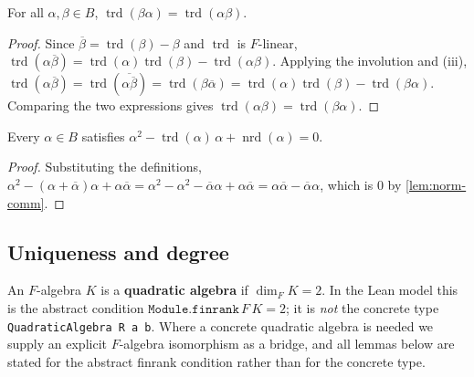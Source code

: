 \begin{lemma}
    \label{lem:trace-comm}
    For all $\alpha, \beta \in B$, $\operatorname{trd}(\beta\alpha) =
    \operatorname{trd}(\alpha\beta)$.
\end{lemma}
\begin{proof}
    Since $\overline\beta = \operatorname{trd}(\beta) - \beta$ and
    $\operatorname{trd}$ is $F$-linear, $\operatorname{trd}(\alpha\overline\beta) =
    \operatorname{trd}(\alpha)\operatorname{trd}(\beta) -
    \operatorname{trd}(\alpha\beta)$. Applying the involution and (iii),
    $\operatorname{trd}(\alpha\overline\beta) =
    \operatorname{trd}(\overline{\alpha\overline\beta}) =
    \operatorname{trd}(\beta\overline\alpha) =
    \operatorname{trd}(\alpha)\operatorname{trd}(\beta) -
    \operatorname{trd}(\beta\alpha)$. Comparing the two expressions gives
    $\operatorname{trd}(\alpha\beta) = \operatorname{trd}(\beta\alpha)$.
\end{proof}

\begin{lemma}
    \label{lem:reduced-char-poly}
    Every $\alpha \in B$ satisfies
    $\alpha^2 - \operatorname{trd}(\alpha)\,\alpha + \operatorname{nrd}(\alpha) = 0$.
\end{lemma}
\begin{proof}
    Substituting the definitions,
    $\alpha^2 - (\alpha+\overline\alpha)\alpha + \alpha\overline\alpha =
    \alpha^2 - \alpha^2 - \overline\alpha\alpha + \alpha\overline\alpha =
    \alpha\overline\alpha - \overline\alpha\alpha$, which is $0$ by
    \ref{lem:norm-comm}.
\end{proof}

\subsection{Uniqueness and degree}

\begin{definition}
    \label{def:quadratic-algebra}
    An $F$-algebra $K$ is a \textbf{quadratic algebra} if $\dim_F K = 2$.
    In the Lean model this is the abstract condition
    $\mathtt{Module.finrank}\,F\,K = 2$; it is \emph{not} the concrete type
    \texttt{QuadraticAlgebra R a b}. Where a concrete quadratic algebra is needed we
    supply an explicit $F$-algebra isomorphism as a bridge, and all lemmas below are
    stated for the abstract finrank condition rather than for the concrete type.
\end{definition}

